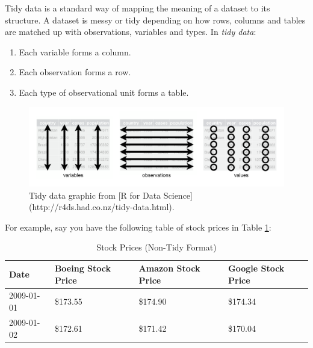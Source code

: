 \documentclass[12pt, krantz2,]{krantz}
\providecommand{\tightlist}{%
  \setlength{\itemsep}{0pt}\setlength{\parskip}{0pt}}
\renewenvironment{quote}{\begin{VF}}{\end{VF}}
\begin{document}
\begin{quote}
Tidy data is a standard way of mapping the meaning of a dataset to its
structure. A dataset is messy or tidy depending on how rows, columns and tables
are matched up with observations, variables and types. In \emph{tidy data}:
\end{quote}

\begin{quote}
\begin{enumerate}
\def\labelenumi{\arabic{enumi}.}
\tightlist
\item
  Each variable forms a column.
\item
  Each observation forms a row.
\item
  Each type of observational unit forms a table.
\end{enumerate}
\end{quote}

\begin{figure}

{\centering \includegraphics[width=\textwidth]{images/tidy-1} 

}

\caption{Tidy data graphic from [R for Data Science](http://r4ds.had.co.nz/tidy-data.html).}\label{fig:tidyfig}
\end{figure}

For example, say you have the following table of stock prices in Table \ref{tab:non-tidy-stocks}:

\begin{table}[H]

\caption{\label{tab:non-tidy-stocks}Stock Prices (Non-Tidy Format)}
\centering
\fontsize{10}{12}\selectfont
\begin{tabular}{llll}
\toprule
Date & Boeing Stock Price & Amazon Stock Price & Google Stock Price\\
\midrule
2009-01-01 & \$173.55 & \$174.90 & \$174.34\\
2009-01-02 & \$172.61 & \$171.42 & \$170.04\\
\bottomrule
\end{tabular}
\end{table}
\end{document}
